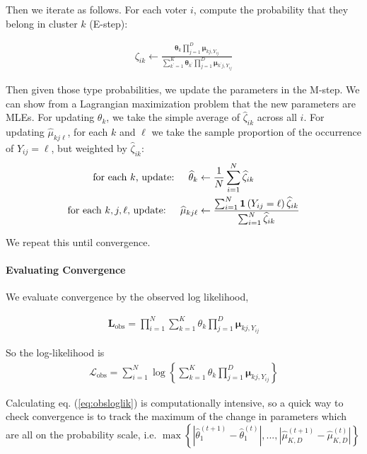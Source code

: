 \documentclass[11pt]{article}
\begin{document}
Then we iterate as follows. For each voter \(i\), compute the probability that they belong in cluster \(k\) (E-step):

\begin{align}
\zeta_{ik} \leftarrow \frac{\bm{\theta}_{k}\prod^{D}_{j=1}\bm{\mu}_{kj,Y_{ij}}}
{\sum^{K}_{k^\prime=1}\bm{\theta}_{k^\prime}\prod^{D}_{j=1}\bm{\mu}_{k^\prime j,Y_{ij}}}
\end{align}

Then given those type probabilities, we update the parameters in the M-step. We can show from a Lagrangian maximization problem that the new parameters are MLEs. For updating \(\theta_k\), we take the simple average of \(\widehat\zeta_{ik}\) across all \(i\). For updating \(\widehat\mu_{kj\ell}\), for each \(k\) and \(\ell\) we take the sample proportion of the occurrence of \(Y_{ij} = \ell\), but weighted by \(\widehat\zeta_{ik}\):
\begin{align}
\text{for each \(k\), update: }~~~  \widehat{\theta}_{k} &\leftarrow \frac{1}{N}\sum^N_{i = 1}\widehat{\zeta}_{ik} \\
\text{for each \(k, j, \ell\), update: }~~~ \widehat{\mu}_{kj\ell} &\leftarrow\frac{\sum^N_{i=1}\bm{1}\left(Y_{ij} = \ell\right)\widehat{\zeta}_{ik}}{\sum^{N}_{i=1}\widehat{\zeta}_{ik}}
\end{align}


We repeat this until convergence. 

\paragraph{Evaluating Convergence} We evaluate convergence by the observed log likelihood, 

\begin{align*}
\mathbf{L}_{\text{obs}} = \prod^N_{i=1}\sum^{K}_{k=1}\theta_k \prod^{D}_{j=1}\bm{\mu}_{kj,Y_{ij}}
\end{align*}

So the log-likelihood is
\begin{align}
\mathcal{L}_{\text{obs}} = \sum^{N}_{i=1}\log \left\{\sum^{K}_{k=1}\theta_k \prod^{D}_{j=1}\bm{\mu}_{kj,Y_{ij}}\right\} \label{eq:obsloglik}
\end{align}

Calculating eq. (\ref{eq:obsloglik}) is computationally intensive, so a quick way to check convergence is to track the maximum of the change in parameters which are all on the probability scale, i.e. \(\max\left\{|\widehat\theta^{(t + 1)}_{1} - \widehat\theta^{(t)}_{1}|, ..., |\widehat\mu^{(t + 1)}_{K,D} - \widehat\mu^{(t)}_{K,D}|\right\}\)
\end{document}
